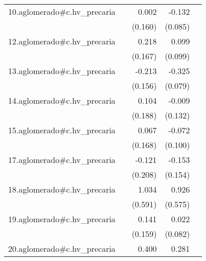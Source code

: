 {\begin{longtable}{l*{4}{D{.}{.}{-1}}}
\addlinespace
10.aglomerado#c.hv\_precaria&                     &       0.002         &      -0.132         &                     \\
            &                     &     (0.160)         &     (0.085)         &                     \\
\addlinespace
12.aglomerado#c.hv\_precaria&                     &       0.218         &       0.099         &                     \\
            &                     &     (0.167)         &     (0.099)         &                     \\
\addlinespace
13.aglomerado#c.hv\_precaria&                     &      -0.213         &      -0.325\sym{***}&                     \\
            &                     &     (0.156)         &     (0.079)         &                     \\
\addlinespace
14.aglomerado#c.hv\_precaria&                     &       0.104         &      -0.009         &                     \\
            &                     &     (0.188)         &     (0.132)         &                     \\
\addlinespace
15.aglomerado#c.hv\_precaria&                     &       0.067         &      -0.072         &                     \\
            &                     &     (0.168)         &     (0.100)         &                     \\
\addlinespace
17.aglomerado#c.hv\_precaria&                     &      -0.121         &      -0.153         &                     \\
            &                     &     (0.208)         &     (0.154)         &                     \\
\addlinespace
18.aglomerado#c.hv\_precaria&                     &       1.034         &       0.926         &                     \\
            &                     &     (0.591)         &     (0.575)         &                     \\
\addlinespace
19.aglomerado#c.hv\_precaria&                     &       0.141         &       0.022         &                     \\
            &                     &     (0.159)         &     (0.082)         &                     \\
\addlinespace
20.aglomerado#c.hv\_precaria&                     &       0.400         &       0.281         &                     \\

\end{longtable}}
